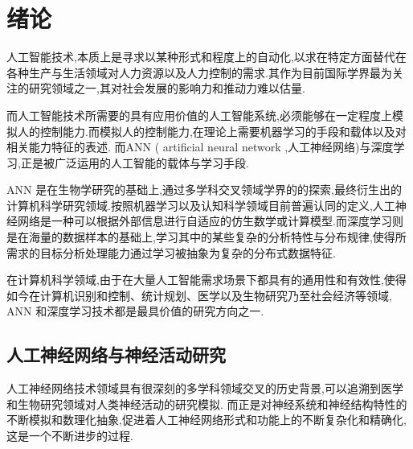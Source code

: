 

\chapter{绪论}

人工智能技术,本质上是寻求以某种形式和程度上的自动化,以求在特定方面替代在各种生产与生活领域对人力资源以及人力控制的需求.其作为目前国际学界最为关注的研究领域之一,其对社会发展的影响力和推动力难以估量.

而人工智能技术所需要的具有应用价值的人工智能系统,必须能够在一定程度上模拟人的控制能力.而模拟人的控制能力,在理论上需要机器学习的手段和载体以及对相关能力特征的表述. 而ANN ( artificial neural network ,人工神经网络)与深度学习,正是被广泛运用的人工智能的载体与学习手段.

ANN 是在生物学研究的基础上,通过多学科交叉领域学界的的探索,最终衍生出的计算机科学研究领域.按照机器学习以及认知科学领域目前普遍认同的定义,人工神经网络是一种可以根据外部信息进行自适应的仿生数学或计算模型.而深度学习则是在海量的数据样本的基础上,学习其中的某些复杂的分析特性与分布规律,使得所需求的目标分析处理能力通过学习被抽象为复杂的分布式数据特征.

在计算机科学领域,由于在大量人工智能需求场景下都具有的通用性和有效性,使得如今在计算机识别和控制、统计规划、医学以及生物研究乃至社会经济等领域, ANN 和深度学习技术都是最具价值的研究方向之一.

\section{人工神经网络与神经活动研究}



人工神经网络技术领域具有很深刻的多学科领域交叉的历史背景,可以追溯到医学和生物研究领域对人类神经活动的研究模拟. 而正是对神经系统和神经结构特性的不断模拟和数理化抽象,促进着人工神经网络形式和功能上的不断复杂化和精确化,这是一个不断进步的过程.

